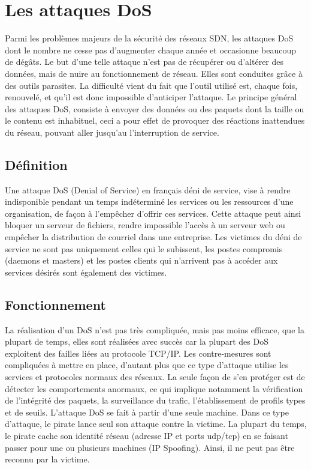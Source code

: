 \section{Les attaques DoS}
Parmi les problèmes majeurs de la sécurité des réseaux SDN, les attaques DoS dont le nombre ne cesse pas d’augmenter chaque année et occasionne beaucoup de dégâts. Le but d’une telle attaque n’est pas de récupérer ou d’altérer des données, mais de nuire au fonctionnement de réseau. Elles sont conduites grâce à des outils parasites. La difficulté vient du fait que l’outil utilisé est, chaque fois, renouvelé, et qu’il est donc impossible d’anticiper l’attaque. Le principe général des attaques DoS, consiste à envoyer des données ou des paquets dont la taille ou le contenu est inhabituel, ceci a pour effet de provoquer des réactions inattendues du réseau, pouvant aller jusqu’au l’interruption de service.

\subsection{Définition}
Une attaque DoS (Denial of Service) en français déni de service, vise à rendre indisponible pendant un temps indéterminé les services ou les ressources d’une organisation, de façon à l’empêcher d’offrir ces services. Cette attaque peut ainsi bloquer un serveur de fichiers, rendre impossible l’accès à un serveur web ou empêcher la distribution de courriel dans une entreprise. 
Les victimes du déni de service ne sont pas uniquement celles qui le subissent, les postes compromis (daemons et masters) et les postes clients qui n’arrivent pas à accéder aux services désirés sont également des victimes.

\subsection{Fonctionnement}
La réalisation d’un DoS n’est pas très compliquée, mais pas moins efficace, que la plupart de temps, elles sont réalisées avec succès car la plupart des DoS exploitent des failles liées au protocole TCP/IP. Les contre-mesures sont compliquées à mettre en place, d’autant plus que ce type d’attaque utilise les services et protocoles normaux des réseaux. La seule façon de s’en protéger est de détecter les comportements anormaux, ce qui implique notamment la vérification de l’intégrité des paquets, la surveillance du trafic, l’établissement de profils types et de seuils. 
L’attaque DoS se fait à partir d’une seule machine. Dans ce type d’attaque, le pirate lance seul son attaque contre la victime. La plupart du temps, le pirate cache son identité réseau (adresse IP et ports udp/tcp) en se faisant passer pour une ou plusieurs machines (IP Spoofing). Ainsi, il ne peut pas être reconnu par la victime.

